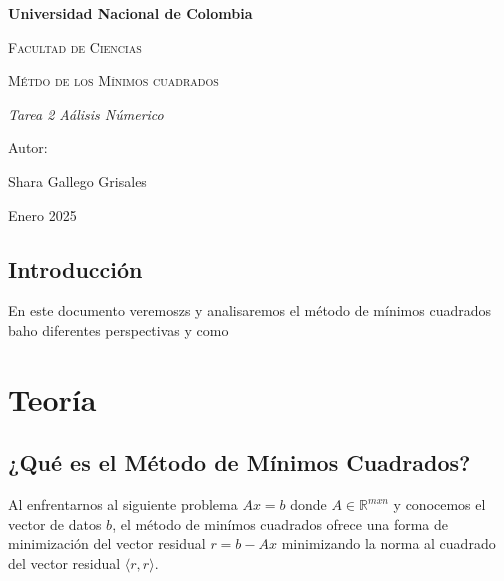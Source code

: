 \documentclass[12pt]{article}
\begin{document}
\begin{titlepage}
\centering
{\bfseries\LARGE Universidad Nacional de Colombia \par}
\vspace{1cm}
{\scshape\Large Facultad de Ciencias \par}
\vspace{3cm}
{\scshape\Huge M\'etdo de los M\'inimos cuadrados\par}
\vspace{3cm}
{\itshape\Large Tarea 2 
A\'alisis N\'umerico\par}
\vfill
{\Large Autor: \par}
{\Large Shara Gallego Grisales \par}
\vfill
{\Large Enero 2025 \par}
\end{titlepage}

\tableofcontents
\vspace{25.0cm}

\begin{center}
\section{Introducci\'on}
\end{center}

\vspace{0.5cm }
En este documento veremoszs y analisaremos el m\'etodo de m\'inimos cuadrados baho diferentes perspectivas y como 
\vspace{0.5cm}



\vspace{21cm}




\section{Teor\'ia}
\vspace{1.5cm}


\subsection{¿Qu\'e es el M\'etodo de M\'inimos Cuadrados?}\vspace{0.5cm} 

Al enfrentarnos al siguiente problema $Ax=b$ donde $A\in\mathbb{R}^{mxn}$ y  conocemos el vector de datos $b$, el m\'etodo de min\'imos cuadrados ofrece una forma de minimizaci\'on del vector residual $r=b-Ax$ minimizando la norma al cuadrado del vector residual $\langle r,r \rangle$.
\end{document}
